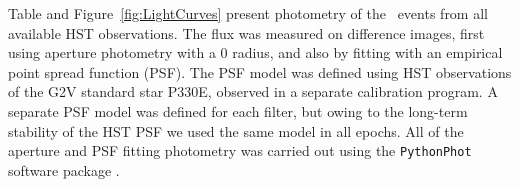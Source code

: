 Table  %
and Figure~\ref{fig:LightCurves} present 
photometry of the \spock\ events
from all available HST observations. The flux was measured on
difference images, first using aperture photometry with a 0
radius, and also by fitting with an empirical point spread function
(PSF).  The PSF model was defined using HST observations of the G2V
standard star P330E, observed in a separate calibration program.  A
separate PSF model was defined for each filter, but owing to the
long-term stability of the HST PSF we used the same model in all
epochs.  All of the aperture and PSF fitting photometry was carried
out using the {\tt PythonPhot} software package \citep{Jones:2015}.






  
  

  
  
  
  
  
  
  
  
  

  
  
